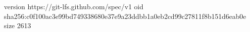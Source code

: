version https://git-lfs.github.com/spec/v1
oid sha256:c0f100ac3e99bd749338680e37e9a23ddbb1a0eb2cd99c27811f8b151d6eab0e
size 2613
